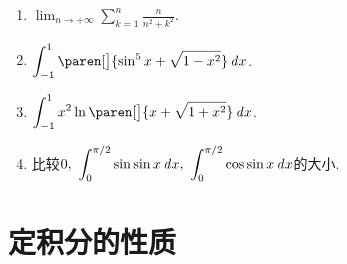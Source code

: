 \documentclass[a4paper,punct=CCT]{ctexbook}
\theoremstyle{break}
\newif\ifshowsol
\let\leq\leqslant
\let\le\leq
\let\geq\geqslant
\let\ge\geq}
\begin{document}
\begin{enumerate}
  \ifshowsol
  因为\(f(x)\)是\((0,+\infty)\)上的单调减函数, 所以易知对于任意\(k \ge 1\)都有
  \[
    \int_k^{k+1} f(x) \dx \le f(k) \le \int_{k-1}^k f(x) \dx.
  \]
  那么
  \[
    \int_1^{n+1} f(x) \dx \le \sum_{k=1}^n f(k) \le \int_0^n f(x) \dx, \quad
    \int_2^{n+1} f(x) \dx \le \sum_{k=2}^n f(k) \le \int_1^n f(x) \dx.
  \]
  然后有
  \[
    \int_1^{n+1} f(x) \dx \le \sum_{k=1}^n f(k) = f(1) + \sum_{k=2}^n f(k) \le f(1) + \int_1^n f(x) \dx.
  \]
  \fi

\item \(\displaystyle \lim_{n\to+\infty} \sum_{k=1}^n \frac{n}{n^2+k^2} \).

  \ifshowsol
  将这个和变形得到
  \[
    \sum_{k=1}^n \frac{n}{n^2+k^2}
    = \sum_{k=1}^n \frac1n \frac{1}{1+\paren[\big]{\frac{k}{n}}^2}.
  \]
  这实际上就是函数\(\frac{1}{1+x^2}\)在\([0,1]\)上的一个下和.  那么
  \[
    \lim_{n\to+\infty} \sum_{k=1}^n \frac{n}{n^2+k^2} = \int_0^1 \frac{\dx}{1+x^2} = \frac{\pi}{4}.
  \]
  \fi

\item \(\displaystyle \int_{-1}^1 \paren[\big]{\sin^5 x + \sqrt{1 - x^2}} \dx\).

  \ifshowsol
  将被积函数分解成一个奇函数和一个偶函数, 积分区间是\([-1,1]\), 奇函数抵消掉变成零, 偶函数变成
  \[
    \int_{-1}^1 \paren[\big]{\sin^5 x + \sqrt{1 - x^2}} \dx
    = \int_{-1}^1 \sin^5 x \dx + 2 \int_0^1 \sqrt{1-x^2} \dx
    = \frac{\pi}{2}.
  \]
  \fi

\item \(\displaystyle \int_{-1}^1 x^2 \ln\paren[\big]{x + \sqrt{1 + x^2}} \dx\).

  \ifshowsol
  因为\(\ln\paren[\big]{x + \sqrt{1 + x^2}} = \arcsinh x\)是一个奇函数, \(x^2\)是一个偶函数, 所以他们的乘积还是一个奇函数.  因此
  \[
    \int_{-1}^1 x^2 \ln\paren[\big]{x + \sqrt{1 + x^2}} \dx = 0.
  \]
  \fi

\item 比较\(\displaystyle 0,\ \int_0^{\pi/2} \sin\sin x \mathop{}\!\mathit{d} x,\ \int_0^{\pi/2} \cos\sin x \mathop{}\!\mathit{d} x\)的大小.
\end{enumerate}
\fi

\section{定积分的性质}
\end{document}

